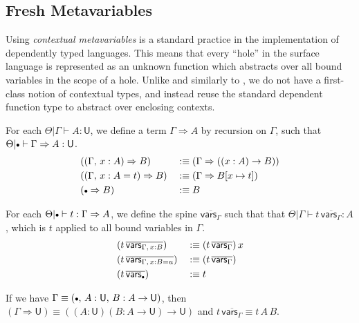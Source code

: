 \documentclass[acmsmall,review,anonymous,prologue,dvipsnames]{acmart}\settopmatter{printfolios=true,printccs=false,printacmref=false}
\renewcommand{\U}{\mathsf{U}}
\newcommand{\emptycon}{\scaleobj{.75}\bullet}
\newcommand{\To}{\Rightarrow}
\theoremstyle{remark}
\begin{document}
\subsection{Fresh Metavariables}

Using \emph{contextual metavariables} is a standard practice in the
implementation of dependently typed languages. This means that every ``hole'' in
the surface language is represented as an unknown function which abstracts over
all bound variables in the scope of a hole. Unlike \citet{nanevski2008contextual}
and similarly to \citet{gundry2013type}, we do not have a first-class notion of
contextual types, and instead reuse the standard dependent function type to
abstract over enclosing contexts.

\begin{definition}\label{def:closingtype} For each $\Theta|\Gamma \vdash A : \U$, we define a term $\Gamma \To A$ by recursion on $\Gamma$, such that $\Theta|\emptycon\vdash
  \Gamma \To A : \U$.
  \begin{alignat*}{3}
    &((\Gamma,\, x : A) \To B)     && :\equiv (\Gamma \To ((x : A) \to B))\\
    &((\Gamma,\, x : A = t) \To B) && :\equiv (\Gamma \To B[x\mapsto t])\\
    &(\emptycon \To B)             && :\equiv B
  \end{alignat*}
\end{definition}

\begin{definition}[Contextualization]\label{def:contextualization}
For each $\Theta|\emptycon \vdash t : \Gamma\To A$, we define the spine
$\overline{\mathsf{vars}_{\Gamma}}$ such that that $\Theta|\Gamma\vdash
t\,\overline{\mathsf{vars}_{\Gamma}} : A$, which is $t$ applied to all bound
variables in $\Gamma$.
  \begin{alignat*}{3}
    &(t\,\overline{\mathsf{vars}_{\Gamma,\,x:B}})   && :\equiv (t\,\overline{\mathsf{vars}_{\Gamma}})\,x \\
    &(t\,\overline{\mathsf{vars}_{\Gamma,\,x:B=u}}) && :\equiv (t\,\overline{\mathsf{vars}_{\Gamma}}) \\
    &(t\,\overline{\mathsf{vars}_{\emptycon}})     && :\equiv t
  \end{alignat*}
\end{definition}

\begin{example} If we have $\Gamma \equiv (\emptycon,\,A : \U,\,B : A \to \U)$, then
$(\Gamma \To \U) \equiv ((A : \U)(B : A \to \U) \to \U)$ and
$t\,\overline{\mathsf{vars}_{\Gamma}} \equiv t\,A\,B$.
\end{example}
\end{document}

